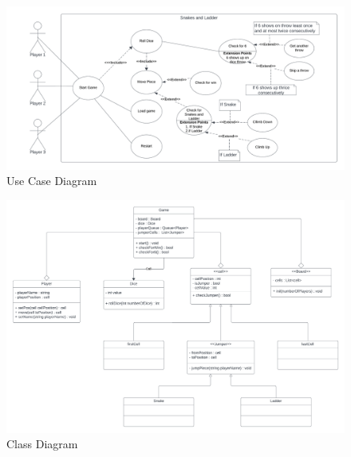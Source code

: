 \documentclass{article}
\begin{document}
\begin{figure}[h]
    \includegraphics[scale = 0.4]{Images/Snakes and ladder.png}
    \caption{Use Case Diagram}
\end{figure}

\begin{figure}[h]
    \includegraphics[scale = 0.35]{Images/class_diagram.png}
    \caption{Class Diagram}
\end{figure}

\newpage
    
\end{document}
